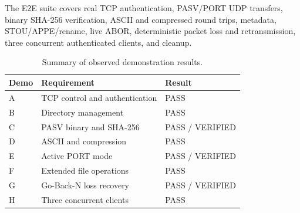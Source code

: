 The E2E suite covers real TCP authentication, PASV/PORT UDP transfers,
binary SHA-256 verification, ASCII and compressed round trips, metadata,
STOU/APPE/rename, live ABOR, deterministic packet loss and retransmission,
three concurrent authenticated clients, and cleanup.

\begin{table}[H]
\centering
\begin{tabular}{lll}
\toprule
Demo & Requirement & Result\\
\midrule
A & TCP control and authentication & PASS\\
B & Directory management & PASS\\
C & PASV binary and SHA-256 & PASS / VERIFIED\\
D & ASCII and compression & PASS\\
E & Active PORT mode & PASS / VERIFIED\\
F & Extended file operations & PASS\\
G & Go-Back-N loss recovery & PASS / VERIFIED\\
H & Three concurrent clients & PASS\\
\bottomrule
\end{tabular}
\caption{Summary of observed demonstration results.}
\end{table}